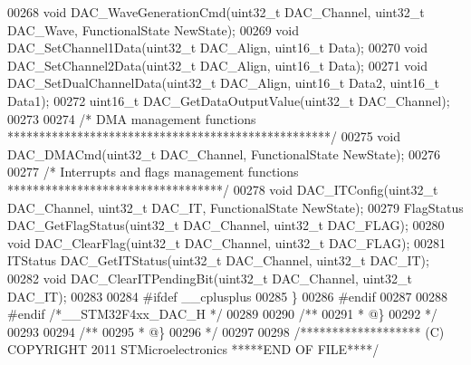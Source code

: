 \begin{DoxyCode}
00268 \textcolor{keywordtype}{void} DAC_WaveGenerationCmd(uint32\_t DAC\_Channel, uint32\_t DAC\_Wave, FunctionalState NewState);
00269 \textcolor{keywordtype}{void} DAC_SetChannel1Data(uint32\_t DAC\_Align, uint16\_t Data);
00270 \textcolor{keywordtype}{void} DAC_SetChannel2Data(uint32\_t DAC\_Align, uint16\_t Data);
00271 \textcolor{keywordtype}{void} DAC_SetDualChannelData(uint32\_t DAC\_Align, uint16\_t Data2, uint16\_t Data1);
00272 uint16\_t DAC_GetDataOutputValue(uint32\_t DAC\_Channel);
00273 
00274 \textcolor{comment}{/* DMA management functions ***************************************************/}
00275 \textcolor{keywordtype}{void} DAC_DMACmd(uint32\_t DAC\_Channel, FunctionalState NewState);
00276 
00277 \textcolor{comment}{/* Interrupts and flags management functions **********************************/}
00278 \textcolor{keywordtype}{void} DAC_ITConfig(uint32\_t DAC\_Channel, uint32\_t DAC\_IT, FunctionalState NewState);
00279 FlagStatus DAC_GetFlagStatus(uint32\_t DAC\_Channel, uint32\_t DAC\_FLAG);
00280 \textcolor{keywordtype}{void} DAC_ClearFlag(uint32\_t DAC\_Channel, uint32\_t DAC\_FLAG);
00281 ITStatus DAC_GetITStatus(uint32\_t DAC\_Channel, uint32\_t DAC\_IT);
00282 \textcolor{keywordtype}{void} DAC_ClearITPendingBit(uint32\_t DAC\_Channel, uint32\_t DAC\_IT);
00283 
00284 \textcolor{preprocessor}{#}\textcolor{preprocessor}{ifdef} \_\_cplusplus
00285 \}
00286 \textcolor{preprocessor}{#}\textcolor{preprocessor}{endif}
00287 
00288 \textcolor{preprocessor}{#}\textcolor{preprocessor}{endif} \textcolor{comment}{/*\_\_STM32F4xx\_DAC\_H */}
00289 
00290 \textcolor{comment}{/**}
00291 \textcolor{comment}{  * @\}}
00292 \textcolor{comment}{  */}
00293 
00294 \textcolor{comment}{/**}
00295 \textcolor{comment}{  * @\}}
00296 \textcolor{comment}{  */}
00297 
00298 \textcolor{comment}{/******************* (C) COPYRIGHT 2011 STMicroelectronics *****END OF FILE****/}
\end{DoxyCode}
